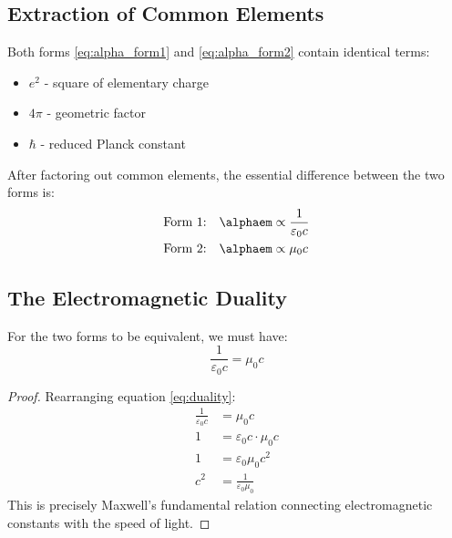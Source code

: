 	\subsection{Extraction of Common Elements}
	
	\begin{proof_step}
		Both forms \eqref{eq:alpha_form1} and \eqref{eq:alpha_form2} contain identical terms:
		\begin{itemize}
			\item $e^2$ - square of elementary charge
			\item $4\pi$ - geometric factor
			\item $\hbar$ - reduced Planck constant
		\end{itemize}
	\end{proof_step}
	
	\begin{proof_step}
		After factoring out common elements, the essential difference between the two forms is:
		\begin{align}
			\text{Form 1:} \quad \alphaem &\propto \frac{1}{\varepsilon_0 c} \label{eq:diff1}\\
			\text{Form 2:} \quad \alphaem &\propto \mu_0 c \label{eq:diff2}
		\end{align}
	\end{proof_step}
	
	\subsection{The Electromagnetic Duality}
	
	\begin{theorem}
		For the two forms to be equivalent, we must have:
		\begin{equation}
			\frac{1}{\varepsilon_0 c} = \mu_0 c \label{eq:duality}
		\end{equation}
	\end{theorem}
	
	\begin{proof}
		Rearranging equation \eqref{eq:duality}:
		\begin{align}
			\frac{1}{\varepsilon_0 c} &= \mu_0 c\\
			1 &= \varepsilon_0 c \cdot \mu_0 c\\
			1 &= \varepsilon_0 \mu_0 c^2\\
			c^2 &= \frac{1}{\varepsilon_0 \mu_0}
		\end{align}
		This is precisely Maxwell's fundamental relation connecting electromagnetic constants with the speed of light.
	\end{proof}
	
